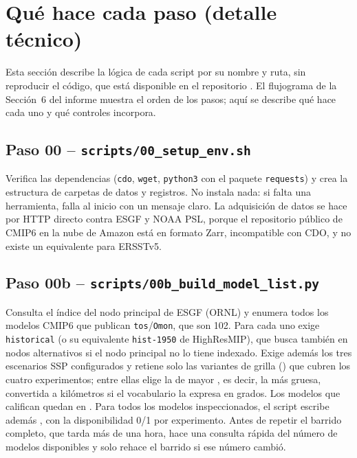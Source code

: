 \section{Qué hace cada paso (detalle técnico)}
\label{sec:pasos}

Esta sección describe la lógica de cada script por su nombre y ruta, sin reproducir el código, que está disponible en el repositorio . El flujograma de la Sección~6 del informe muestra el orden de los pasos; aquí se describe qué hace cada uno y qué controles incorpora.

\subsection{Paso 00 -- \texttt{scripts/00\_setup\_env.sh}}
Verifica las dependencias (\texttt{cdo}, \texttt{wget}, \texttt{python3} con el paquete \texttt{requests}) y crea la estructura de carpetas de datos y registros. No instala nada: si falta una herramienta, falla al inicio con un mensaje claro. La adquisición de datos se hace por HTTP directo contra ESGF y NOAA PSL, porque el repositorio público de CMIP6 en la nube de Amazon está en formato Zarr, incompatible con CDO, y no existe un equivalente para ERSSTv5.

\subsection{Paso 00b -- \texttt{scripts/00b\_build\_model\_list.py}}
Consulta el índice del nodo principal de ESGF (ORNL) y enumera todos los modelos CMIP6 que publican \texttt{tos}/\texttt{Omon}, que son 102. Para cada uno exige \texttt{historical} (o su equivalente \texttt{hist-1950} de HighResMIP), que busca también en nodos alternativos si el nodo principal no lo tiene indexado. Exige además los tres escenarios SSP configurados y retiene solo las variantes de grilla () que cubren los cuatro experimentos; entre ellas elige la de mayor , es decir, la más gruesa, convertida a kilómetros si el vocabulario la expresa en grados. Los modelos que califican quedan en . Para todos los modelos inspeccionados, el script escribe además , con la disponibilidad 0/1 por experimento. Antes de repetir el barrido completo, que tarda más de una hora, hace una consulta rápida del número de modelos disponibles y solo rehace el barrido si ese número cambió.

